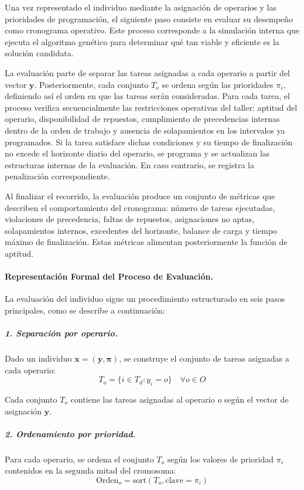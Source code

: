 Una vez representado el individuo mediante la asignación de operarios y las prioridades 
de programación, el siguiente paso consiste en evaluar su desempeño como cronograma 
operativo. Este proceso corresponde a la simulación interna que ejecuta el algoritmo 
genético para determinar qué tan viable y eficiente es la solución candidata.

La evaluación parte de separar las tareas asignadas a cada operario a partir del vector 
$\mathbf{y}$. Posteriormente, cada conjunto $T_o$ se ordena según las prioridades 
$\pi_i$, definiendo así el orden en que las tareas serán consideradas. Para cada tarea, 
el proceso verifica secuencialmente las restricciones operativas del taller: aptitud del 
operario, disponibilidad de repuestos, cumplimiento de precedencias internas dentro de 
la orden de trabajo y ausencia de solapamientos en los intervalos ya programados. Si la 
tarea satisface dichas condiciones y su tiempo de finalización no excede el horizonte 
diario del operario, se programa y se actualizan las estructuras internas de la evaluación. 
En caso contrario, se registra la penalización correspondiente. 

Al finalizar el recorrido, la evaluación produce un conjunto de métricas que describen 
el comportamiento del cronograma: número de tareas ejecutadas, violaciones de 
precedencia, faltas de repuestos, asignaciones no aptas, solapamientos internos, 
excedentes del horizonte, balance de carga y tiempo máximo de finalización. Estas 
métricas alimentan posteriormente la función de aptitud.

\paragraph{Representación Formal del Proceso de Evaluación.}

La evaluación del individuo sigue un procedimiento estructurado en seis pasos principales, 
como se describe a continuación:

\subparagraph{1. Separación por operario.}
Dado un individuo $\mathbf{x} = (\mathbf{y}, \boldsymbol{\pi})$, se construye el conjunto de tareas 
asignadas a cada operario:
\[
T_o = \{ i \in T_d : y_i = o \} \quad \forall o \in O
\]

Cada conjunto $T_o$ contiene las tareas asignadas al operario $o$ según el vector de asignación $\mathbf{y}$.

\subparagraph{2. Ordenamiento por prioridad.}
Para cada operario, se ordena el conjunto $T_o$ según los valores de prioridad $\pi_i$ 
contenidos en la segunda mitad del cromosoma:
\[
\mathrm{Orden}_o = \mathrm{sort}(T_o, \text{clave} = \pi_i)
\]

